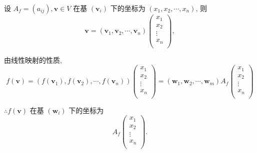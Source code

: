 \documentclass{ctexart}
\begin{document}
设 $A_f=(a_{ij}),\boldsymbol{v}\in V$ 在基 $(\boldsymbol{v}_i)$ 下的坐标为 $(x_1,x_2,\cdots,x_n)$, 则
\[\boldsymbol{v}=(\boldsymbol{v}_1,\boldsymbol{v}_2,\cdots,\boldsymbol{v}_n)\begin{pmatrix}
    x_1 \\
    x_2 \\
    \vdots \\
    x_n \\
\end{pmatrix},\]

由线性映射的性质,
\[f(\boldsymbol{v})=(f(\boldsymbol{v}_1),f(\boldsymbol{v}_2),\cdots,f(\boldsymbol{v}_n))\begin{pmatrix}
    x_1 \\
    x_2 \\
    \vdots \\
    x_n \\
\end{pmatrix}=(\boldsymbol{w}_1,\boldsymbol{w}_2,\cdots,\boldsymbol{w}_m)A_f\begin{pmatrix}
    x_1 \\
    x_2 \\
    \vdots \\
    x_n \\
\end{pmatrix}\]

$\therefore f(\boldsymbol{v})$ 在基 $(\boldsymbol{w}_i)$ 下的坐标为
\[A_f\begin{pmatrix}
    x_1 \\
    x_2 \\
    \vdots \\
    x_n \\
\end{pmatrix}.\]
\end{document}
